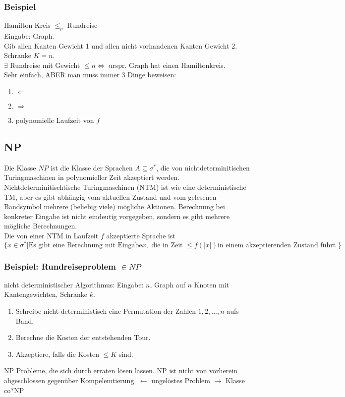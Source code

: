 \subsubsection{Beispiel}
Hamilton-Kreis $\leq_p$ Rundreise\\
Eingabe: Graph.\\
Gib allen Kanten Gewicht 1 und allen nicht vorhandenen Kanten Gewicht 2. Schranke $K=n$.\\
$\exists$ Rundreise mit Gewicht $\leq n \Leftrightarrow$ urspr. Graph hat einen Hamiltonkreis.\\
Sehr einfach, ABER man muss immer 3 Dinge beweisen:
\begin{enumerate}
\item $\Leftarrow$
\item $\Rightarrow$
\item polynomielle Laufzeit von $f$
\end{enumerate} 
\subsection{NP}
Die Klasse $NP$ ist die Klasse der Sprachen $A \subseteq \sigma^*$, die von nichtdeterminitischen Turingmaschinen in polynomieller Zeit akzeptiert werden.\\
Nichtdeterminitischtische Turingmaschinen (NTM) ist wie eine deterministische TM, aber es gibt abhängig vom aktuellen Zustand und vom gelesenen Bandsymbol mehrere (beliebig viele) mögliche Aktionen. Berechnung bei konkreter Eingabe ist nicht eindeutig vorgegeben, sondern es gibt mehrere mögliche Berechnungen.\\
Die von einer NTM in Laufzeit $f$ akzeptierte Sprache ist $\{x \in \sigma^* | \text{Es gibt eine Berechnung mit Eingabe} x,\text{ die in Zeit }\leq f(|x|) \text{in einem akzeptierenden Zustand führt }\}$\\
\subsubsection{Beispiel: Rundreiseproblem $\in NP$}
nicht deterministischer Algorithmus: Eingabe: $n$, Graph auf $n$ Knoten mit Kantengewichten, Schranke $k$.
\begin{enumerate}
\item Schreibe nicht deterministisch eine Permutation der Zahlen $1,2,...,n$ aufs Band.
\item Berechne die Kosten der entstehenden Tour.
\item Akzeptiere, falls die Kosten $\leq K$ sind.
\end{enumerate}
NP Probleme, die sich durch erraten lösen lassen.
NP ist nicht von vorherein abgeschlossen gegenüber Kompelemtierung. $\leftarrow$ ungelöstes Problem $\rightarrow$ Klasse co*NP